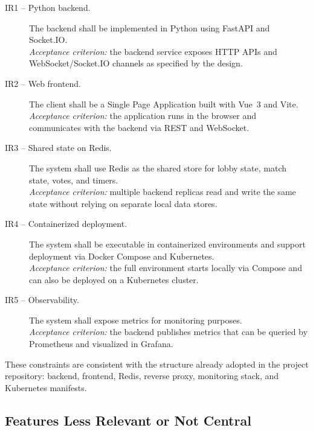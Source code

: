 \documentclass{scrartcl}
\begin{document}
\begin{description}
    \item[IR1 -- Python backend.] The backend shall be implemented in Python using FastAPI and Socket.IO.\\
    \textit{Acceptance criterion:} the backend service exposes HTTP APIs and WebSocket/Socket.IO channels as specified by the design.

    \item[IR2 -- Web frontend.] The client shall be a Single Page Application built with Vue~3 and Vite.\\
    \textit{Acceptance criterion:} the application runs in the browser and communicates with the backend via REST and WebSocket.

    \item[IR3 -- Shared state on Redis.] The system shall use Redis as the shared store for lobby state, match state, votes, and timers.\\
    \textit{Acceptance criterion:} multiple backend replicas read and write the same state without relying on separate local data stores.

    \item[IR4 -- Containerized deployment.] The system shall be executable in containerized environments and support deployment via Docker Compose and Kubernetes.\\
    \textit{Acceptance criterion:} the full environment starts locally via Compose and can also be deployed on a Kubernetes cluster.

    \item[IR5 -- Observability.] The system shall expose metrics for monitoring purposes.\\
    \textit{Acceptance criterion:} the backend publishes metrics that can be queried by Prometheus and visualized in Grafana.
\end{description}

These constraints are consistent with the structure already adopted in the project repository: backend, frontend, Redis, reverse proxy, monitoring stack, and Kubernetes manifests.

\subsection{Features Less Relevant or Not Central}
\end{document}
